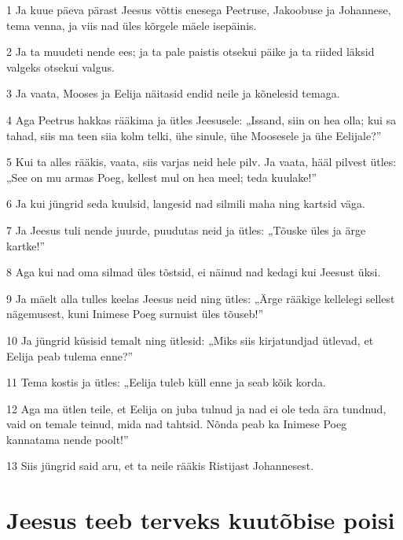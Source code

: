 \par 1 Ja kuue päeva pärast Jeesus võttis enesega Peetruse, Jakoobuse ja Johannese, tema venna, ja viis nad üles kõrgele mäele isepäinis.
\par 2 Ja ta muudeti nende ees; ja ta pale paistis otsekui päike ja ta riided läksid valgeks otsekui valgus.
\par 3 Ja vaata, Mooses ja Eelija näitasid endid neile ja kõnelesid temaga.
\par 4 Aga Peetrus hakkas rääkima ja ütles Jeesusele: „Issand, siin on hea olla; kui sa tahad, siis ma teen siia kolm telki, ühe sinule, ühe Moosesele ja ühe Eelijale?”
\par 5 Kui ta alles rääkis, vaata, siis varjas neid hele pilv. Ja vaata, hääl pilvest ütles: „See on mu armas Poeg, kellest mul on hea meel; teda kuulake!”
\par 6 Ja kui jüngrid seda kuulsid, langesid nad silmili maha ning kartsid väga.
\par 7 Ja Jeesus tuli nende juurde, puudutas neid ja ütles: „Tõuske üles ja ärge kartke!”
\par 8 Aga kui nad oma silmad üles tõstsid, ei näinud nad kedagi kui Jeesust üksi.
\par 9 Ja mäelt alla tulles keelas Jeesus neid ning ütles: „Ärge rääkige kellelegi sellest nägemusest, kuni Inimese Poeg surnuist üles tõuseb!”
\par 10 Ja jüngrid küsisid temalt ning ütlesid: „Miks siis kirjatundjad ütlevad, et Eelija peab tulema enne?”
\par 11 Tema kostis ja ütles: „Eelija tuleb küll enne ja seab kõik korda.
\par 12 Aga ma ütlen teile, et Eelija on juba tulnud ja nad ei ole teda ära tundnud, vaid on temale teinud, mida nad tahtsid. Nõnda peab ka Inimese Poeg kannatama nende poolt!”
\par 13 Siis jüngrid said aru, et ta neile rääkis Ristijast Johannesest.

\section*{Jeesus teeb terveks kuutõbise poisi}

